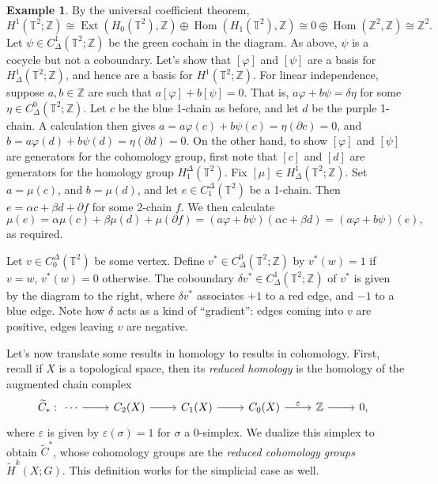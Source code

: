 \documentclass{book}
\newcommand{\bbT}{\mathbb{T}}
\newcommand{\bbZ}{\mathbb{Z}}
\renewcommand{\epsilon}{\varepsilon}
\renewcommand{\phi}{\varphi}
\DeclareMathOperator{\Hom}{Hom}
\DeclareMathOperator{\Ext}{Ext}
\theoremstyle{definition}
\newtheorem{example}[theorem]{Example}
\theoremstyle{remark}
\numberwithin{equation}{section}
\begin{document}
\begin{example}
    By the universal coefficient theorem,
    \begin{equation}
        H^1(\bbT^2;\bbZ) \cong \Ext(H_0(\bbT^2),\bbZ) \oplus \Hom(H_1(\bbT^2),\bbZ) \cong 0 \oplus \Hom(\bbZ^2,\bbZ) \cong \bbZ^2.
    \end{equation}
    Let $\psi \in C^1_\Delta(\bbT^2;\bbZ)$ be the green cochain in the diagram. As above, $\psi$ is a cocycle but not a coboundary. Let's show that $[\phi]$ and $[\psi]$ are a basis for $H^1_\Delta(\bbT^2;\bbZ)$, and hence are a basis for $H^1(\bbT^2;\bbZ)$. For linear independence, suppose $a,b \in \bbZ$ are such that $a[\phi] + b[\psi] = 0$. That is, $a\phi + b\psi = \delta\eta$ for some $\eta \in C^0_\Delta(\bbT^2;\bbZ)$. Let $c$ be the blue 1-chain as before, and let $d$ be the purple 1-chain. A calculation then gives $a = a\phi(c) + b\psi(c) = \eta(\partial c) = 0$, and $b = a\phi(d) + b\psi(d) = \eta(\partial d) = 0$. On the other hand, to show $[\phi]$ and $[\psi]$ are generators for the cohomology group, first note that $[c]$ and $[d]$ are generators for the homology group $H_1^\Delta(\bbT^2)$. Fix $[\mu] \in H^1_\Delta(\bbT^2;\bbZ)$. Set $a = \mu(c)$, and $b = \mu(d)$, and let $e \in C_1^\Delta(\bbT^2)$ be a 1-chain. Then $e = \alpha c + \beta d + \partial f$ for some 2-chain $f$. We then calculate 
    \begin{equation}
        \mu(e) = \alpha \mu(c) + \beta \mu(d) + \mu(\partial f) 
               = (a\phi + b\psi)(\alpha c + \beta d) 
               = (a\phi + b\psi)(e),
    \end{equation}
    as required.

    Let $v \in C_0^\Delta(\bbT^2)$ be some vertex. Define $v^* \in C^0_\Delta(\bbT^2;\bbZ)$ by $v^*(w) = 1$ if $v = w$, $v^*(w) = 0$ otherwise. The coboundary $\delta v^* \in C^1_\Delta(\bbT^2;\bbZ)$ of $v^*$ is given by the diagram to the right, where $\delta v^*$ associates $+1$ to a red edge, and $-1$ to a blue edge. Note how $\delta$ acts as a kind of ``gradient'': edges coming into $v$ are positive, edges leaving $v$ are negative.
\end{example}

Let's now translate some results in homology to results in cohomology. First, recall if $X$ is a topological space, then its \textit{reduced homology} is the homology of the augmented chain complex 
\begin{equation} 
    \widetilde{C}_* : 
    \begin{tikzcd}
        \cdots \arrow[r] & C_2(X) \arrow[r] & C_1(X) \arrow[r] & C_0(X) \arrow[r,"\epsilon"] & \bbZ \arrow[r] & 0,
    \end{tikzcd}
\end{equation}
where $\epsilon$ is given by $\epsilon(\sigma) = 1$ for $\sigma$ a 0-simplex. We dualize this simplex to obtain $\widetilde{C}^*$, whose cohomology groups are the \textit{reduced cohomology groups} $\widetilde{H}^k(X;G)$. This definition works for the simplicial case as well.
\end{document}
